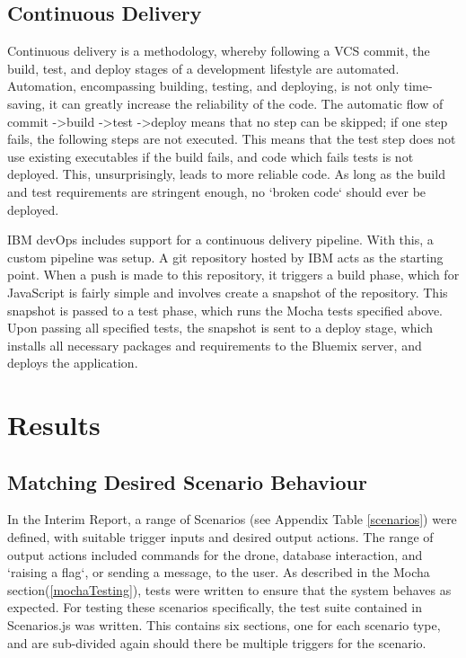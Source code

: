 \documentclass{article}
\begin{document}
\subsection{Continuous Delivery} \label{ContinuousDelivery}
Continuous delivery is a methodology, whereby following a VCS commit, the build, test, and deploy stages of a development lifestyle are automated. Automation, encompassing building, testing, and deploying, is not only time-saving, it can greatly increase the reliability of the code. The automatic flow of commit -\textgreater build -\textgreater test -\textgreater deploy means that no step can be skipped; if one step fails, the following steps are not executed. This means that the test step does not use existing executables if the build fails, and code which fails tests is not deployed. This, unsurprisingly, leads to more reliable code. As long as the build and test requirements are stringent enough, no `broken code` should ever be deployed\cite{co475}.

IBM devOps includes support for a continuous delivery pipeline. With this, a custom pipeline was setup. A git repository hosted by IBM acts as the starting point. When a push is made to this repository, it triggers a build phase, which for JavaScript is fairly simple and involves create a snapshot of the repository. This snapshot is passed to a test phase, which runs the Mocha tests specified above. Upon passing all specified tests, the snapshot is sent to a deploy stage, which installs all necessary packages and requirements to the Bluemix server, and deploys the application. 




\section{Results}

\subsection{Matching Desired Scenario Behaviour}\label{resultsScenarios}
In the Interim Report, a range of Scenarios (see Appendix Table \ref{scenarios}) were defined, with suitable trigger inputs and desired output actions. The range of output actions included commands for the drone, database interaction, and `raising a flag`, or sending a message, to the user. As described in the Mocha section(\ref{mochaTesting}), tests were written to ensure that the system behaves as expected. For testing these scenarios specifically, the test suite contained in Scenarios.js was written. This contains six sections, one for each scenario type, and are sub-divided again should there be multiple triggers for the scenario. 
\end{document}

